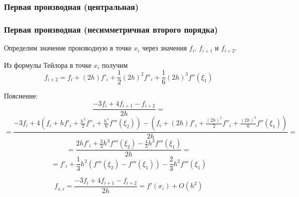 \documentclass[10pt]{beamer}
\begin{document}
\begin{frame}[fragile]
\frametitle{Первая производная (центральная)}

\begin{center}
\end{center}
\end{frame}


\begin{frame}[fragile]
\frametitle{Первая производная (несимметричная второго порядка)}
Определим значение производную в точке $x_i$ через значения $f_{i}$, $f_{i+1}$ и $f_{i+2}$.

Из формулы Тейлора в точке $x_i$ получим
$$f_{i+2} = f_{i} + (2 h) f'_i + \frac12 (2 h)^2 f''_i + \frac16 (2 h)^3 f''(\xi_1)$$ 

Пояснение:
$$\frac{- 3 f_i + 4 f_{i + 1} -f_{i + 2}}{2 h} = $$
$$= \frac{
- 3 f_i
+ 4 (f_{i} + h f'_i + \frac{h^2}{2} f''_i + \frac{h^3}{6} f'''(\xi_2)) 
-(f_{i} + (2 h) f'_i + \frac{(2 h)^2}{2}  f''_i + \frac{(2 h)^3}{6} f''(\xi_1)) 
}{2 h} =$$
$$ = \frac{2 h f'_i + \frac23 h^3 f'''(\xi_2) - \frac43 h^3 f'''(\xi_1) }{2 h} = $$
$$= f'_i + \frac13 h^2 (f'''(\xi_2) - f'''(\xi_1) ) - \frac23 h^2 f'''(\xi_1)$$

$$f_{\tilde{x}, i} = \frac{-3f_{i} + 4 f_{i + 1} - f_{i+2}}{2 h} = f'(x_i) + O(h^2)$$
\end{frame}
\end{document}
